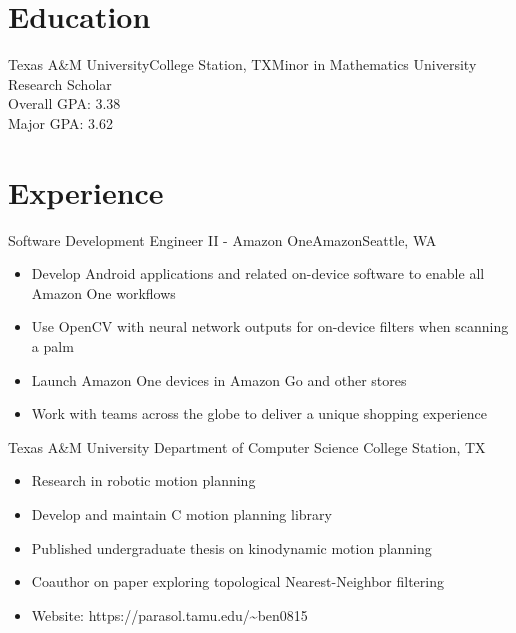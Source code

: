 \documentclass[11pt,a4paper,sans]{moderncv}
\newcommand{\Rplus}{\protect\hspace{-.1em}\protect\raisebox{.35ex}{\smaller{\smaller\textbf{+}}}}
\newcommand{\Cpp}{\mbox{C\Rplus\Rplus}\xspace}
\newcommand{\spacing}{4pt}
\begin{document}
\makecvtitle

\vspace{-1em}


\section{Education}

\vspace{\spacing}

    {Texas A\&M University}{College Station, TX}{Minor in Mathematics}
    {University Research Scholar \\ Overall GPA: 3.38 \\ Major GPA: 3.62}

\section{Experience}

\vspace{\spacing}

  {Software Development Engineer II - Amazon One}{Amazon}{Seattle, WA}{}
    {\vspace{3pt}
    \begin{itemize}
      \setlength{\itemindent}{1em}
      \item Develop Android applications and related on-device software to enable all Amazon One workflows
      \item Use OpenCV with neural network outputs for on-device filters when
        scanning a palm
      \item Launch Amazon One devices in Amazon Go and other stores
      \item Work with teams across the globe to deliver a unique shopping
        experience
    \end{itemize}
    }

\vspace{\spacing}

  {Texas A\&M University Department of Computer Science}
    {College Station, TX}{}{\vspace{3pt}
    \begin{itemize}
      \setlength{\itemindent}{1em}
      \item Research in robotic motion planning
      \item Develop and maintain \Cpp motion planning library
      \item Published undergraduate thesis on kinodynamic motion planning
      \item Coauthor on paper exploring topological Nearest-Neighbor filtering
      \item Website: https://parasol.tamu.edu/\textasciitilde ben0815
    \end{itemize}
    }
\end{document}
